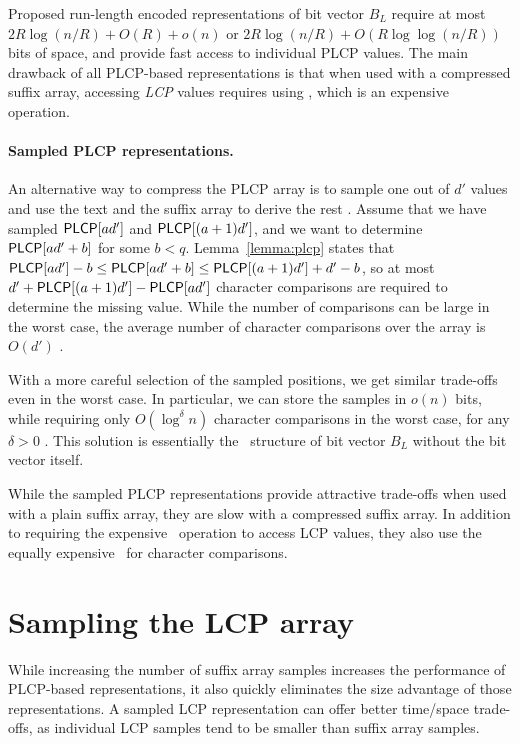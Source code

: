 Proposed run-length encoded representations of bit vector $B_{L}$ require at most $2R \log (n/R) + O(R) + o(n)$ \cite{Fischer2009a} or $2R \log (n/R) + O(R \log \log (n/R))$ \cite{Maekinen2010} bits of space, and provide fast access to individual PLCP values. The main drawback of all PLCP-based representations is that when used with a compressed suffix array, accessing \emph{LCP} values requires using \locate, which is an expensive operation.

\paragraph{Sampled PLCP representations.}

An alternative way to compress the PLCP array is to sample one out of $d'$ values and use the text and the suffix array to derive the rest \cite{Khmelev2004}. Assume that we have sampled $\mathsf{PLCP}[ad']$ and $\mathsf{PLCP}[(a+1)d']$, and we want to determine $\mathsf{PLCP}[ad' + b]$ for some $b < q$. Lemma~\ref{lemma:plcp} states that $\mathsf{PLCP}[ad'] - b \le \mathsf{PLCP}[ad' + b] \le \mathsf{PLCP}[(a+1)d'] + d' - b$, so at most $d' + \mathsf{PLCP}[(a+1)d'] - \mathsf{PLCP}[ad']$ character comparisons are required to determine the missing value. While the number of comparisons can be large in the worst case, the average number of character comparisons over the array is $O(d')$ \cite{Kaerkkaeinen2009}.

With a more careful selection of the sampled positions, we get similar trade-offs even in the worst case. In particular, we can store the samples in $o(n)$ bits, while requiring only $O(\log^{\delta} n)$ character comparisons in the worst case, for any $\delta > 0$ \cite{Fischer2009}. This solution is essentially the \select\ structure of bit vector $B_{L}$ without the bit vector itself.

While the sampled PLCP representations provide attractive trade-offs when used with a plain suffix array, they are slow with a compressed suffix array. In addition to requiring the expensive \locate\ operation to access LCP values, they also use the equally expensive \extract\ for character comparisons.


\section{Sampling the LCP array}

While increasing the number of suffix array samples increases the performance of PLCP-based representations, it also quickly eliminates the size advantage of those representations. A sampled LCP representation can offer better time/space trade-offs, as individual LCP samples tend to be smaller than suffix array samples.

